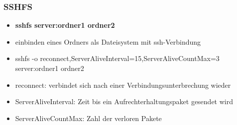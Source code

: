 \begin{frame}
\frametitle{SSHFS}
\begin{itemize}
\item \textbf{sshfs server:ordner1 ordner2}
\pause
\item einbinden eines Ordners als Dateisystem mit ssh-Verbindung
\pause
\item sshfs -o reconnect,ServerAliveInterval=15,ServerAliveCountMax=3 server:ordner1 ordner2
\pause
\item reconnect: verbindet sich nach einer Verbindungsunterbrechung wieder
\pause
\item ServerAliveInterval: Zeit bis ein Aufrechterhaltungspaket gesendet wird
\pause
\item ServerAliveCountMax: Zahl der verloren Pakete
\end{itemize}
\end{frame}